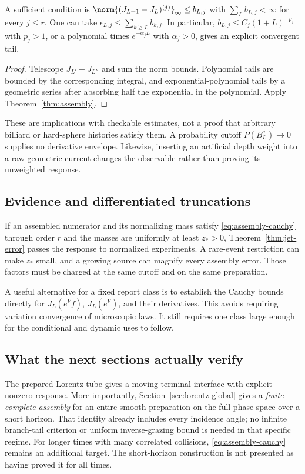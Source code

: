 \begin{corollary}\label{cor:tail-budget}
A sufficient condition is
$\norm{(J_{L+1}-J_L)^{(j)}}_\infty\le b_{L,j}$ with
$\sum_Lb_{L,j}<\infty$ for every $j\le r$. One can take
$\epsilon_{L,j}\le\sum_{k\ge L}b_{k,j}$. In particular, $b_{L,j}\le C_j(1+L)^{-p_j}$ with $p_j>1$, or a polynomial times $e^{-\alpha_jL}$ with $\alpha_j>0$, gives an explicit convergent tail.
\end{corollary}
\begin{proof}
Telescope $J_{L'}-J_{L''}$ and sum the norm bounds. Polynomial tails are bounded by the corresponding integral, and exponential-polynomial tails by a geometric series after absorbing half the exponential in the polynomial. Apply Theorem~\ref{thm:assembly}.
\end{proof}

These are implications with checkable estimates, not a proof that arbitrary billiard or hard-sphere histories satisfy them. A probability cutoff $P(B_L^c)\to0$ supplies no derivative envelope. Likewise, inserting an artificial depth weight into a raw geometric current changes the observable rather than proving its unweighted response.

\subsection{Evidence and differentiated truncations}
If an assembled numerator and its normalizing mass satisfy \eqref{eq:assembly-cauchy} through order $r$ and the masses are uniformly at least $z_*>0$, Theorem~\ref{thm:jet-error} passes the response to normalized experiments. A rare-event restriction can make $z_*$ small, and a growing source can magnify every assembly error. Those factors must be charged at the same cutoff and on the same preparation.

A useful alternative for a fixed report class is to establish the Cauchy bounds directly for $J_L(e^Vf)$, $J_L(e^V)$, and their derivatives. This avoids requiring variation convergence of microscopic laws. It still requires one class large enough for the conditional and dynamic uses to follow.

\subsection{What the next sections actually verify}
The prepared Lorentz tube gives a moving terminal interface with explicit nonzero response. More importantly, Section~\ref{sec:lorentz-global} gives a \emph{finite complete assembly} for an entire smooth preparation on the full phase space over a short horizon. That identity already includes every incidence angle; no infinite branch-tail criterion or uniform inverse-grazing bound is needed in that specific regime. For longer times with many correlated collisions, \eqref{eq:assembly-cauchy} remains an additional target. The short-horizon construction is not presented as having proved it for all times.
\par
